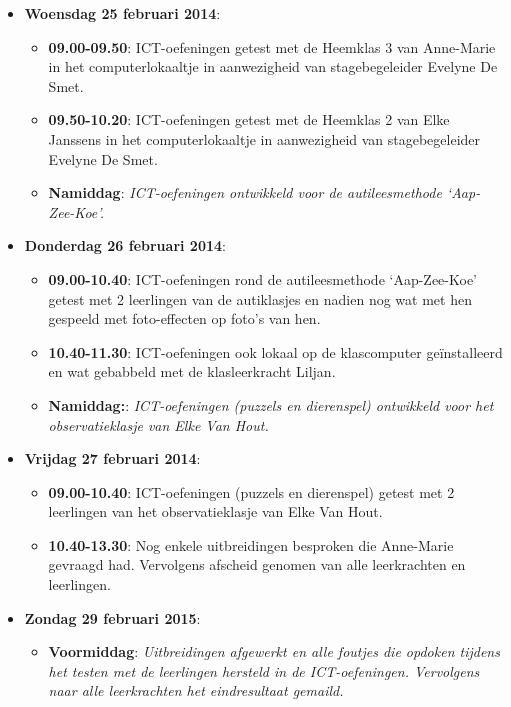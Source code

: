 \documentclass[a4paper,11pt]{article}
\theoremstyle{definition}
\begin{document}
\begin{itemize}
\begin{itemize}
  \item  \textbf{Woensdag 25 februari 2014}:     
  \begin{itemize}
    \item \textbf{09.00-09.50}:   ICT-oefeningen getest met de Heemklas 3 van Anne-Marie in het computerlokaaltje in aanwezigheid van stagebegeleider Evelyne De Smet.
     \item \textbf{09.50-10.20}:   ICT-oefeningen getest met de Heemklas 2 van Elke Janssens in het computerlokaaltje in aanwezigheid van stagebegeleider Evelyne De Smet.
     \item \textbf{Namiddag}: \emph{ICT-oefeningen ontwikkeld voor de autileesmethode `Aap-Zee-Koe'.}
  \end{itemize}
   \item  \textbf{Donderdag 26 februari 2014}:     
  \begin{itemize}
    \item \textbf{09.00-10.40}:   ICT-oefeningen rond de autileesmethode `Aap-Zee-Koe' getest met 2 leerlingen 
    van de autiklasjes    en nadien nog wat met hen gespeeld met foto-effecten op foto's van hen.
        \item \textbf{10.40-11.30}:  ICT-oefeningen ook lokaal op de 
        klascomputer geïnstalleerd en wat gebabbeld met de klasleerkracht 
        Liljan.
     \item \textbf{Namiddag:}: \emph{ICT-oefeningen (puzzels en dierenspel) ontwikkeld voor het observatieklasje van Elke Van Hout.}
     \end{itemize}
     \item  \textbf{Vrijdag 27 februari 2014}:     
  \begin{itemize}
    \item \textbf{09.00-10.40}:   ICT-oefeningen (puzzels en dierenspel) getest 
    met 2 leerlingen van het observatieklasje van Elke Van Hout.
   \item \textbf{10.40-13.30}:  Nog enkele uitbreidingen besproken die Anne-Marie gevraagd had. 
   Vervolgens afscheid genomen van alle leerkrachten en leerlingen.
   \end{itemize}
   
 \item \textbf{Zondag 29 februari 2015}:  
 \begin{itemize}
    \item \textbf{Voormiddag}: \emph{Uitbreidingen afgewerkt en alle foutjes die opdoken tijdens het testen met de leerlingen hersteld in de ICT-oefeningen. Vervolgens
    naar alle leerkrachten het eindresultaat gemaild.}
    
  \end{itemize}
  \end{itemize}
  
  
\end{itemize}
\end{document}
